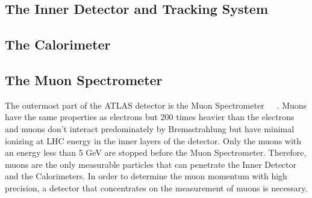 \subsection{The Inner Detector and Tracking System}

\subsection{The Calorimeter}

\subsection{The Muon Spectrometer}

The outermost part of the ATLAS detector is the Muon Spectrometer~\cite{1748-0221-3-08-S08003}~\cite{Palestini:681459}~\cite{0910.2767}.
Muons have the same properties as electrons but 200 times heavier than the electrons and muons don't interact predominately by Bremsstrahlung but have minimal ionizing at LHC energy in the inner layers of the detector.
Only the muons with an energy less than 5 GeV are stopped before the Muon Spectrometer.
Therefore, muons are the only measurable particles that can penetrate the Inner Detector and the Calorimeters.
In order to determine the muon momentum with high precision, a detector that concentrates on the measurement of muons is necessary.

